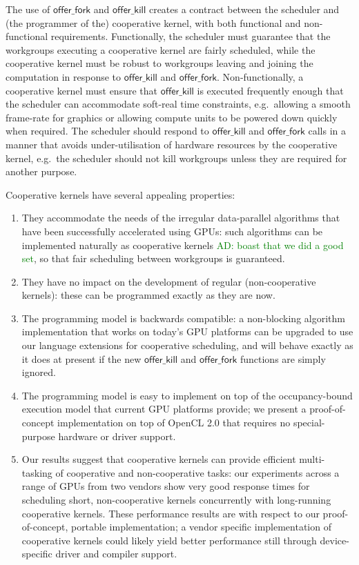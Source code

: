 \documentclass[nocopyrightspace]{sigplanconf-pldi16}
\newcommand{\ADComment}[1]{\textcolor{green}{AD: #1}}
\newcommand{\offerfork}{\mathsf{offer\_fork}}
\newcommand{\offerkill}{\mathsf{offer\_kill}}
\begin{document}
The use of $\offerfork$ and $\offerkill$ creates a contract between
the scheduler and (the programmer of the) cooperative kernel, with
both functional and non-functional requirements.  Functionally, the
scheduler must guarantee that the workgroups executing a cooperative
kernel are fairly scheduled, while the cooperative kernel must be robust to
workgroups leaving and joining the computation in response to $\offerkill$
and $\offerfork$.
Non-functionally, a cooperative kernel must ensure that $\offerkill$
is executed frequently enough that the scheduler can accommodate
soft-real time constraints, e.g.\ allowing a smooth frame-rate for
graphics or allowing compute units to be powered down quickly when
required.  The scheduler should respond to $\offerkill$ and
$\offerfork$ calls in a manner that avoids under-utilisation of
hardware resources by the cooperative kernel, e.g.\ the scheduler
should not kill workgroups unless they are required for another
purpose.

Cooperative kernels have several appealing properties:

\begin{enumerate}

\item They
accommodate the needs of the irregular
data-parallel algorithms that have been successfully accelerated using GPUs: such algorithms can be implemented naturally
as cooperative kernels \ADComment{boast that we did a good set}, so
that fair scheduling between workgroups is guaranteed.

\item They
have no impact on the development of regular (non-cooperative
kernels): these can be programmed exactly as they are now.

\item The
programming model is backwards compatible: a non-blocking algorithm
implementation that works on today's GPU platforms can be upgraded to
use our language extensions for cooperative scheduling, and will
behave exactly as it does at present if the new $\offerkill$ and
$\offerfork$ functions are simply ignored.

\item The programming
model is easy to implement on top of the occupancy-bound execution
model that current GPU platforms provide; we present a
proof-of-concept implementation on top of OpenCL 2.0 that requires no
special-purpose hardware or driver support.

\item Our results
suggest that cooperative kernels can provide efficient multi-tasking
of cooperative and non-cooperative tasks: our experiments across a
range of GPUs from two vendors show very good response times for
scheduling short, non-cooperative kernels concurrently with
long-running cooperative kernels.  These performance results are with
respect to our proof-of-concept, portable implementation; a vendor
specific implementation of cooperative kernels could likely yield
better performance still through device-specific driver and compiler
support.

\end{enumerate}
\end{document}

